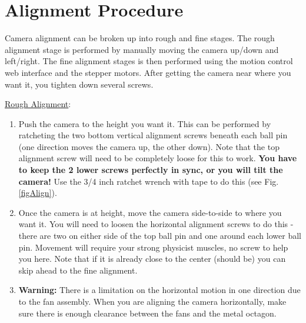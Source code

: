 \documentclass[11pt]{article}
\begin{document}
\section{Alignment Procedure}
\label{alignSec}

Camera alignment can be broken up into rough and fine stages.
The rough alignment stage is performed by manually moving the camera up/down and left/right.
The fine alignment stages is then performed using the motion control web interface and the stepper motors.
After getting the camera near where you want it, you tighten down several screws.

\underline{Rough Alignment}:
\begin{enumerate}
	\item Push the camera to the height you want it.  
		This can be performed by ratcheting the two bottom vertical alignment screws beneath each ball pin (one direction moves the camera up, the other down).
		Note that the top alignment screw will need to be completely loose for this to work. 
		{\bf You have to keep the 2 lower screws perfectly in sync, or you will tilt the camera!}
		Use the 3/4 inch ratchet wrench with tape to do this (see Fig. \ref{figAlign}).
	\item Once the camera is at height, move the camera side-to-side to where you want it.
		You will need to loosen the horizontal alignment screws to do this - there are two on either side of the top ball pin and one around each lower ball pin.
		Movement will require your strong physicist muscles, no screw to help you here.
		Note that if it is already close to the center (should be) you can skip ahead to the fine alignment.
	\item {\bf Warning: }  There is a limitation on the horizontal motion in one direction due to the fan assembly.  
		When you are aligning the camera horizontally, make sure there is enough clearance between the fans and the metal octagon.
\end{enumerate}
\end{document}
